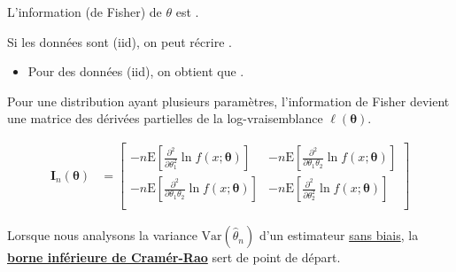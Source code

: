 \documentclass[french]{article}
\begin{document}
\begin{multicols*}{2}
\begin{definitionNOHFILL}
L'information (de Fisher) de $\theta$ est . 

\bigskip

Si les données sont (iid), on peut récrire .

\begin{itemize}
	\item	Pour des données (iid), on obtient que .
\end{itemize}
\end{definitionNOHFILL}


\begin{definitionNOHFILL}
Pour une distribution ayant plusieurs paramètres, l'information de Fisher devient une matrice des dérivées partielles de la log-vraisemblance $\ell(\bm{\theta})$.

\begin{definitionNOHFILLsub}[Matrice d'information (de Fisher) pour $\bm{\theta} = (\theta_{1}, \theta_{2})$]
\begin{align*}
	\bm{I}_{n}(\bm{\theta})
	&=	\begin{bmatrix}
		-n\text{E}\left[\frac{\partial^{2}}{\partial\theta_{1}^{2}} \ln f(x; \bm{\theta})\right]	&	-n\text{E}\left[\frac{\partial^{2}}{\partial\theta_{1}\theta_{2}} \ln f(x; \bm{\theta})\right]	\\
		-n\text{E}\left[\frac{\partial^{2}}{\partial\theta_{1}\theta_{2}} \ln f(x; \bm{\theta})\right]	&	-n\text{E}\left[\frac{\partial^{2}}{\partial\theta_{2}^{2}} \ln f(x; \bm{\theta})\right]	\\
		\end{bmatrix}
\end{align*}
\end{definitionNOHFILLsub}
\end{definitionNOHFILL}


\begin{definitionNOHFILL}
\begin{rappel_enhanced}[Motivation]
Lorsque nous analysons la variance $\text{Var}(\hat{\theta}_{n})$ d'un estimateur \underline{sans biais}, la \hyperlink{cramer-rao}{\textbf{borne inférieure de Cramér-Rao}} sert de point de départ. 
\end{rappel_enhanced}


\end{definitionNOHFILL}
\end{multicols*}
\end{document}
